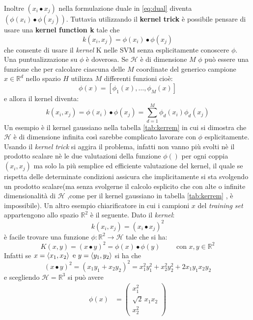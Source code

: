 Inoltre $(x_i \bullet x_j)$ nella formulazione duale in \eqref{eq:dual} diventa $(\phi(x_i) \bullet \phi(x_j))$. Tuttavia utilizzando il \textbf{kernel trick} è possibile pensare di usare una \textbf{kernel function k} tale che
\begin{equation}
\label{eq:kerdef}
k(x_i , x_j) = \phi(x_i) \bullet \phi(x_j)
\end{equation}
che consente di usare il \textit{kernel} K nelle \ac{SVM} senza esplicitamente conoscere $\phi$.
Una puntualizzazione su $\phi$ è doverosa. Se $\mathcal{H}$ è di dimensione $M$ $\phi$ può essere una funzione che per calcolare ciascuna delle $M$ coordinate del generico campione $x \in \mathbb{R}^{d}$ nello spazio $H$ utilizza $M$ differenti funzioni cioè:
\[
\phi(x) =[\phi_1(x),\dots,\phi_M(x)]
\]
e allora il kernel diventa:
\begin{equation}
k(x_i , x_j) = \phi(x_i) \bullet \phi(x_j) = \sum_{d=1}^{M}\phi_d(x_i)\phi_d(x_j)
\end{equation}
 Un esempio è il kernel gaussiano nella tabella \ref{tab:kerrem} in cui si dimostra che $\mathcal{H}$ è di dimensione infinita così sarebbe complicato lavorare con $\phi$ esplicitamente. Usando il \textit{kernel trick} si aggira il problema, infatti non vanno più svolti nè il prodotto scalare nè le due valutazioni della funzione $\phi()$ per ogni coppia $(x_i , x_j)$  ma solo la più semplice ed efficiente valutazione del kernel, il quale se rispetta delle determinate condizioni assicura che implicitamente si sta svolgendo un prodotto scalare(ma senza svolgerne il calcolo esplicito che con alte o infinite dimensionalità di $\mathcal{H}$ ,come per il kernel gaussiano in tabella \ref{tab:kerrem} , è impossibile). Un altro esempio chiarificatore in cui i campioni $x$ del \textit{training set} appartengono allo spazio $\mathbb{R}^2$ è il seguente. Dato il \textit{kernel}:
 \begin{equation*}
 k(x_i,x_j) = (x_i \bullet x_j)^2
 \end{equation*}
 è facile trovare una funzione $\phi : \mathbb{R}^2 \to \mathcal{H}$ tale che si ha:
\begin{equation*}
 K(x,y) = (x \bullet y)^2 = \phi(x) \bullet \phi(y) \qquad \text{ con } x,y \in \mathbb{R}^2
\end{equation*}
Infatti se $x=\braket{x_1 , x_2} \text{ e } y=\braket{y_1 , y_2}$ si ha che
\begin{equation}
\label{eq:kernelex}
(x \bullet y)^2 = (x_1y_1 + x_2y_2)^2 = x_{1}^{2}y_{1}^{2} + x_{2}^{2}y_{2}^{2} + 2x_{1}y_{1}x_{2}y_{2}
\end{equation}
e scegliendo $\mathcal{H} = \mathbb{R}^3$ si può avere
 \begin{align*}
    \phi(x) &= \begin{pmatrix}
           x_{1}^2 \\
           \sqrt{2}\,x_{1}x_{2} \\
           x_{2}^2
         \end{pmatrix}
  \end{align*}
 
